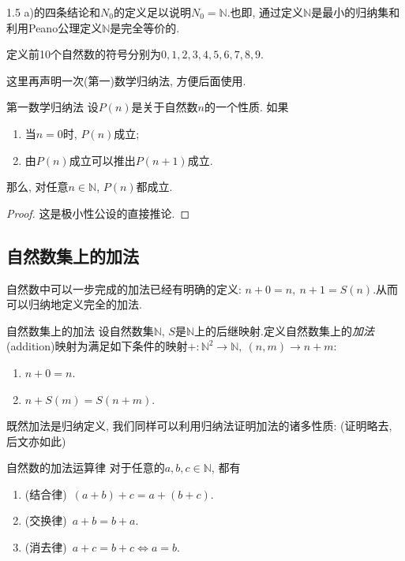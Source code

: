 1.5 a)的四条结论和$N_0$的定义足以说明$N_0=\mathbb{N}$.也即, 通过定义$\mathbb{N}$是最小的归纳集和利用Peano公理定义$\mathbb{N}$是完全等价的.

定义前10个自然数的符号分别为$0, 1, 2, 3, 4, 5, 6, 7, 8, 9$.

这里再声明一次(第一)数学归纳法, 方便后面使用.

\begin{theorem}{第一数学归纳法} \label{thm:diyigvna}
	设$P(n)$是关于自然数$n$的一个性质. 如果
	\begin{enumerate}
		\item 当$n=0$时, $P(n)$成立; 
		\item 由$P(n)$成立可以推出$P(n+1)$成立.
	\end{enumerate}
	那么, 对任意$n \in \mathbb{N}$, $P(n)$都成立.
\end{theorem}
\begin{proof}
	这是极小性公设的直接推论. 
\end{proof}

\subsection{自然数集上的加法}

自然数中可以一步完成的加法已经有明确的定义: $n+0=n, ~n+1=S(n)$.从而可以归纳地定义完全的加法.

\begin{definition}{自然数集上的加法}
	设自然数集$\mathbb{N}$, $S$是$\mathbb{N}$上的后继映射.定义自然数集上的\textit{加法}(addition)映射为满足如下条件的映射$+: \mathbb{N}^2 \to \mathbb{N}, ~(n, m) \to n+m$: 
	\begin{enumerate}
		\item $n+0=n$.
		\item $n+S(m)=S(n+m)$.
	\end{enumerate}
\end{definition}

既然加法是归纳定义, 我们同样可以利用归纳法证明加法的诸多性质: (证明略去, 后文亦如此)

\begin{proposition}{自然数的加法运算律}
	对于任意的$a, b, c \in \mathbb{N}$, 都有
	\begin{enumerate}
		\item (结合律)~$(a+b)+c = a+(b+c)$.
		\item (交换律)~$a+b=b+a$.
		\item (消去律)~$a+c=b+c \Leftrightarrow a=b$.
	\end{enumerate}
\end{proposition}

